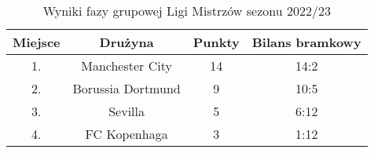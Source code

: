 \begin{table}[htbp]
\centering
\begin{tabular}{||c c c c||} 
 \hline
 Miejsce & Drużyna & Punkty & Bilans bramkowy \\ [0.5ex] 
 \hline\hline
 1. & Manchester City & 14 & 14:2 \\ 
 \hline
 2. & Borussia Dortmund & 9 & 10:5 \\
 \hline
 3. & Sevilla & 5 & 6:12 \\
 \hline
 4. & FC Kopenhaga & 3 & 1:12 \\
 \hline
\end{tabular}
\label{tab:tabela_ucl}
\caption{Wyniki fazy grupowej Ligi Mistrzów sezonu 2022/23}
\end{table}